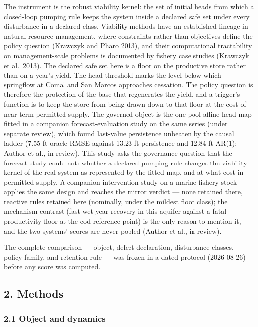 \documentclass[11pt]{article}
\begin{document}
The instrument is the robust viability kernel: the set of initial heads
from which a closed-loop pumping rule keeps the system inside a declared
safe set under every disturbance in a declared class. Viability methods
have an established lineage in natural-resource management, where
constraints rather than objectives define the policy question (Krawczyk
and Pharo 2013), and their computational tractability on
management-scale problems is documented by fishery case studies
(Krawczyk et al.~2013). The declared safe set here is a floor on the
productive store rather than on a year's yield. The head threshold marks
the level below which springflow at Comal and San Marcos approaches
cessation. The policy question is therefore the protection of the base
that regenerates the yield, and a trigger's function is to keep the
store from being drawn down to that floor at the cost of near-term
permitted supply. The governed object is the one-pool affine head map
fitted in a companion forecast-evaluation study on the same series
(under separate review), which found last-value persistence unbeaten by
the causal ladder (7.55-ft oracle RMSE against 13.23 ft persistence and
12.84 ft AR(1); Author et al., in review). This study asks the
governance question that the forecast study could not: whether a
declared pumping rule changes the viability kernel of the real system as
represented by the fitted map, and at what cost in permitted supply. A
companion intervention study on a marine fishery stock applies the same
design and reaches the mirror verdict --- none retained there, reactive
rules retained here (nominally, under the mildest floor class); the
mechanism contrast (fast wet-year recovery in this aquifer against a
fatal productivity floor at the cod reference point) is the only reason
to mention it, and the two systems' scores are never pooled (Author et
al., in review).

The complete comparison --- object, defect declaration, disturbance
classes, policy family, and retention rule --- was frozen in a dated
protocol (2026-08-26) before any score was computed.

\subsection{2. Methods}\label{methods}

\subsubsection{2.1 Object and dynamics}\label{object-and-dynamics}
\end{document}
